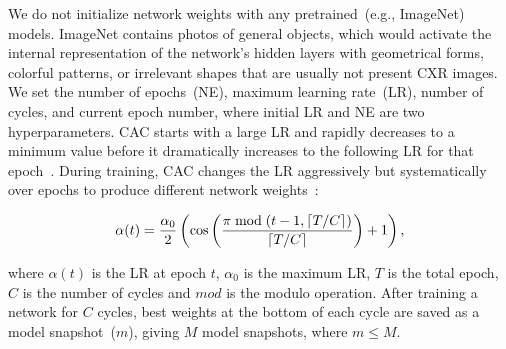 \documentclass[conference]{IEEEtran}
\begin{document}

We do not initialize network weights with any pretrained~(e.g., ImageNet) models. ImageNet contains photos of general objects, which would activate the internal representation of the network's hidden layers with geometrical forms, colorful patterns, or irrelevant shapes that are usually not present CXR images. 
We set the number of epochs~(NE), maximum learning rate~(LR), number of cycles, and current epoch number, where initial LR and NE are two hyperparameters. CAC starts with a large LR and rapidly decreases to a minimum value before it dramatically increases to the following LR for that epoch~\cite{huang2017snapshot}. During 
training, CAC changes the LR aggressively but systematically over epochs to produce different network weights~\cite{huang2017snapshot}: 

\vspace{-2mm}
\begin{equation}
    \label{eq:lr-cosine}
    \scriptsize{
    \alpha(t)=\frac{\alpha_{0}}{2}\left(\cos \left(\frac{\pi \bmod (t-1,\lceil T / C\rceil)}{\lceil T / C\rceil}\right)+1\right),}
\end{equation}

where $\alpha(t)$ is the LR at epoch $t$, $\alpha_0$ is the maximum LR, $T$ is the total epoch, $C$ is the number of cycles and $mod$ is the modulo operation. After training a network for $C$ cycles, best weights at the bottom of each cycle are saved as a model snapshot~($m$), giving $M$ model snapshots, where $m \leq M$. 
\end{document}

